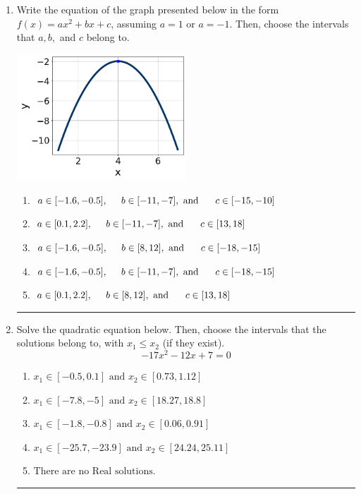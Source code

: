 \documentclass[14pt]{extbook}
\newcommand{\litem}[1]{\item#1\hspace*{-1cm}\rule{\textwidth}{0.4pt}}
\begin{document}
\begin{enumerate}
{\begin{enumerate}[label=\Alph*.]
\end{enumerate} }
\litem{
Write the equation of the graph presented below in the form $f(x)=ax^2+bx+c$, assuming  $a=1$ or $a=-1$. Then, choose the intervals that $a, b,$ and $c$ belong to.
\begin{center}
    \includegraphics[width=0.5\textwidth]{../Figures/quadraticGraphToEquationB.png}
\end{center}
\begin{enumerate}[label=\Alph*.]
\item \( a \in [-1.6, -0.5], \hspace*{5mm} b \in [-11, -7], \text{ and } \hspace*{5mm} c \in [-15, -10] \)
\item \( a \in [0.1, 2.2], \hspace*{5mm} b \in [-11, -7], \text{ and } \hspace*{5mm} c \in [13, 18] \)
\item \( a \in [-1.6, -0.5], \hspace*{5mm} b \in [8, 12], \text{ and } \hspace*{5mm} c \in [-18, -15] \)
\item \( a \in [-1.6, -0.5], \hspace*{5mm} b \in [-11, -7], \text{ and } \hspace*{5mm} c \in [-18, -15] \)
\item \( a \in [0.1, 2.2], \hspace*{5mm} b \in [8, 12], \text{ and } \hspace*{5mm} c \in [13, 18] \)

\end{enumerate} }
\litem{
Solve the quadratic equation below. Then, choose the intervals that the solutions belong to, with $x_1 \leq x_2$ (if they exist).\[ -17x^{2} -12 x + 7 = 0 \]\begin{enumerate}[label=\Alph*.]
\item \( x_1 \in [-0.5, 0.1] \text{ and } x_2 \in [0.73, 1.12] \)
\item \( x_1 \in [-7.8, -5] \text{ and } x_2 \in [18.27, 18.8] \)
\item \( x_1 \in [-1.8, -0.8] \text{ and } x_2 \in [0.06, 0.91] \)
\item \( x_1 \in [-25.7, -23.9] \text{ and } x_2 \in [24.24, 25.11] \)
\item \( \text{There are no Real solutions.} \)


\end{enumerate}}
\end{enumerate}
\end{document}
